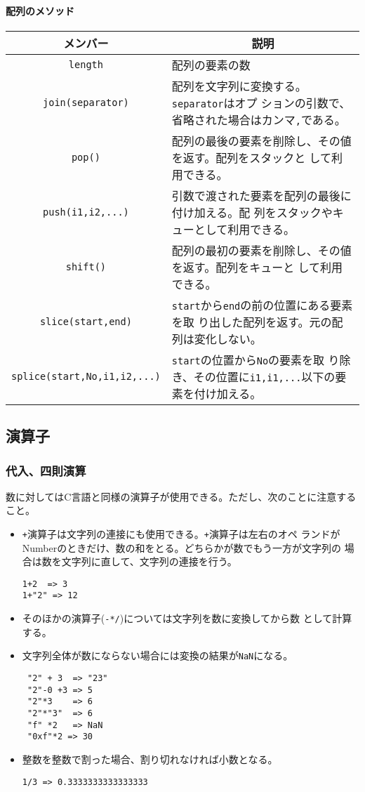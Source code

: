 \paragraph{配列のメソッド}
\begin{center}
 \begin{tabular}{|c|m{}|}\hline
 メンバー&\multicolumn{1}{c|}{説明} \\\hline
  \verb+length+ &配列の要素の数\\ \hline
  \verb+join(separator)+& 配列を文字列に変換する。\verb+separator+はオプ
      ションの引数で、省略された場合はカンマ\verb+,+である。\\ \hline
  \verb+pop()+& 配列の最後の要素を削除し、その値を返す。配列をスタックと
      して利用できる。\\ \hline
  \verb+push(i1,i2,...)+& 引数で渡された要素を配列の最後に付け加える。配
      列をスタックやキューとして利用できる。\\ \hline
  \verb+shift()+&配列の最初の要素を削除し、その値を返す。配列をキューと
      して利用できる。\\ \hline
  \verb+slice(start,end)+&\verb+start+から\verb+end+の前の位置にある要素を取
      り出した配列を返す。元の配列は変化しない。\\ \hline
  \verb+splice(start,No,i1,i2,...)+&\verb+start+の位置から\verb+No+の要素を取
      り除き、その位置に\verb+i1,i1,...+以下の要素を付け加える。\\ \hline
\end{tabular}
\end{center}
\subsection{演算子}
\subsubsection{代入、四則演算}
数に対してはC言語と同様の演算子が使用できる。ただし、次のことに注意する
こと。
\begin{itemize}
 \item \verb-+-演算子は文字列の連接にも使用できる。\verb-+-演算子は左右のオペ
ランドがNumberのときだけ、数の和をとる。どちらかが数でもう一方が文字列の
場合は数を文字列に直して、文字列の連接を行う。
\begin{verbatim}
1+2  => 3
1+"2" => 12
\end{verbatim}
 \item そのほかの演算子(\verb+-*/+)については文字列を数に変換してから数
       として計算する。
 \item 文字列全体が数にならない場合には変換の結果が\verb+NaN+になる。
\begin{verbatim}
 "2" + 3  => "23"
 "2"-0 +3 => 5
 "2"*3    => 6
 "2"*"3"  => 6
 "f" *2   => NaN
 "0xf"*2 => 30
\end{verbatim}
 \item 整数を整数で割った場合、割り切れなければ小数となる。
\begin{verbatim}
1/3 => 0.3333333333333333
\end{verbatim}
\end{itemize}


